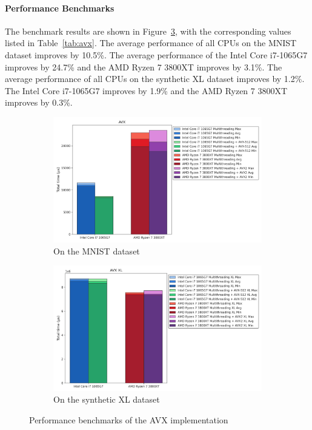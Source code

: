 \documentclass[modern,longauthor]{aastex7}
\begin{document}
\paragraph{Performance Benchmarks}
The benchmark results are shown in Figure~\ref{fig:avx}, with the corresponding values listed in Table~\ref{tab:avx}. The average performance of all CPUs on the MNIST dataset improves by 10.5\%. The average performance of the Intel Core i7-1065G7 improves by 24.7\% and the AMD Ryzen 7 3800XT improves by 3.1\%. The average performance of all CPUs on the synthetic XL dataset improves by 1.2\%. The Intel Core i7-1065G7 improves by 1.9\% and the AMD Ryzen 7 3800XT improves by 0.3\%.
\begin{figure}[htb!]
\centering
\begin{subfigure}{.5\textwidth}
  \centering
  \includegraphics[width=\linewidth]{Graphs/AVX.png}
  \caption{On the MNIST dataset}
 \label{fig:avx_mnist}
\end{subfigure}%
\begin{subfigure}{.5\textwidth}
  \centering
  \includegraphics[width=\linewidth]{Graphs/AVX XL.png}
  \caption{On the synthetic XL dataset}
 \label{fig:avx_xl}
\end{subfigure}
\caption{Performance benchmarks of the AVX implementation}
\label{fig:avx}
\end{figure}
\end{document}
